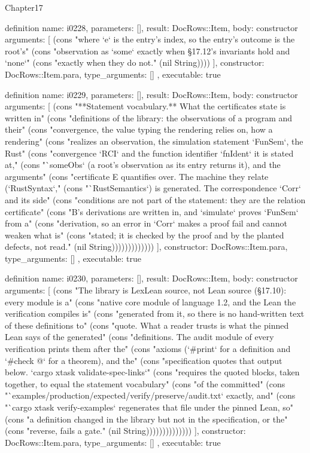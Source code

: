 \begin{lexlean}{Chapter17}
\begin{semanticmodule}
definition{
  name: i0228,
  parameters: [],
  result: DocRows::Item,
  body: constructor{
    arguments: [
      (cons "where `e` is the entry's index, so the entry's outcome is the root's" (cons "observation as `some` exactly when §17.12's invariants hold and `none`" (cons "exactly when they do not." (nil String))))
    ],
    constructor: DocRows::Item.para,
    type_arguments: []
  },
  executable: true
}

definition{
  name: i0229,
  parameters: [],
  result: DocRows::Item,
  body: constructor{
    arguments: [
      (cons "**Statement vocabulary.** What the certificates state is written in" (cons "definitions of the library: the observations of a program and their" (cons "convergence, the value typing the rendering relies on, how a rendering" (cons "realizes an observation, the simulation statement `FunSem`, the Rust" (cons "convergence `RCI` and the function identifier `fnIdent` it is stated at," (cons "`someObs` (a root's observation as its entry returns it), and the arguments" (cons "certificate E quantifies over. The machine they relate (`RustSyntax`," (cons "`RustSemantics`) is generated. The correspondence `Corr` and its side" (cons "conditions are not part of the statement: they are the relation certificate" (cons "B's derivations are written in, and `simulate` proves `FunSem` from a" (cons "derivation, so an error in `Corr` makes a proof fail and cannot weaken what is" (cons "stated; it is checked by the proof and by the planted defects, not read." (nil String)))))))))))))
    ],
    constructor: DocRows::Item.para,
    type_arguments: []
  },
  executable: true
}

definition{
  name: i0230,
  parameters: [],
  result: DocRows::Item,
  body: constructor{
    arguments: [
      (cons "The library is LexLean source, not Lean source (§17.10): every module is a" (cons "native core module of language 1.2, and the Lean the verification compiles is" (cons "generated from it, so there is no hand-written text of these definitions to" (cons "quote. What a reader trusts is what the pinned Lean says of the generated" (cons "definitions. The audit module of every verification prints them after the" (cons "axioms (`#print` for a definition and `#check @` for a theorem), and the" (cons "specification quotes that output below. `cargo xtask validate-spec-links`" (cons "requires the quoted blocks, taken together, to equal the statement vocabulary" (cons "of the committed" (cons "`examples/production/expected/verify/preserve/audit.txt` exactly, and" (cons "`cargo xtask verify-examples` regenerates that file under the pinned Lean, so" (cons "a definition changed in the library but not in the specification, or the" (cons "reverse, fails a gate." (nil String))))))))))))))
    ],
    constructor: DocRows::Item.para,
    type_arguments: []
  },
  executable: true
}


\end{semanticmodule}
\end{lexlean}
